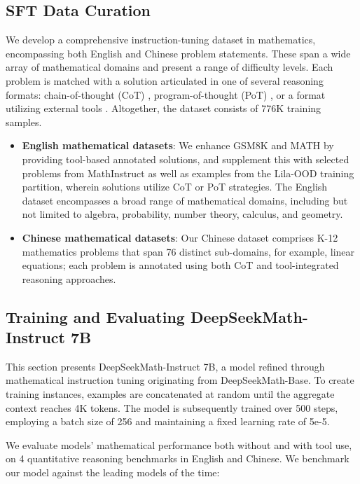 \begin{itemize}[topsep=0pt]
\subsection{SFT Data Curation}

We develop a comprehensive instruction-tuning dataset in mathematics, encompassing both English and Chinese problem statements. These span a wide array of mathematical domains and present a range of difficulty levels. Each problem is matched with a solution articulated in one of several reasoning formats: chain-of-thought (CoT) \citep{cot}, program-of-thought (PoT) \citep{pot,pal}, or a format utilizing external tools \citep{tora}. Altogether, the dataset consists of 776K training samples.

\begin{itemize}[topsep=0pt]
    \item \textbf{English mathematical datasets}: We enhance GSM8K and MATH by providing tool-based annotated solutions, and supplement this with selected problems from MathInstruct \citep{MathInstruct} as well as examples from the Lila-OOD \citep{lila} training partition, wherein solutions utilize CoT or PoT strategies. The English dataset encompasses a broad range of mathematical domains, including but not limited to algebra, probability, number theory, calculus, and geometry.
    \item \textbf{Chinese mathematical datasets}: Our Chinese dataset comprises K-12 mathematics problems that span 76 distinct sub-domains, for example, linear equations; each problem is annotated using both CoT and tool-integrated reasoning approaches.
\end{itemize}

\subsection{Training and Evaluating DeepSeekMath-Instruct 7B}

This section presents DeepSeekMath-Instruct 7B, a model refined through mathematical instruction tuning originating from DeepSeekMath-Base. To create training instances, examples are concatenated at random until the aggregate context reaches 4K tokens. The model is subsequently trained over 500 steps, employing a batch size of 256 and maintaining a fixed learning rate of 5e-5.

We evaluate models' mathematical performance both without and with tool use, on 4 quantitative reasoning benchmarks in English and Chinese. We benchmark our model against the leading models of the time:


\end{itemize}
